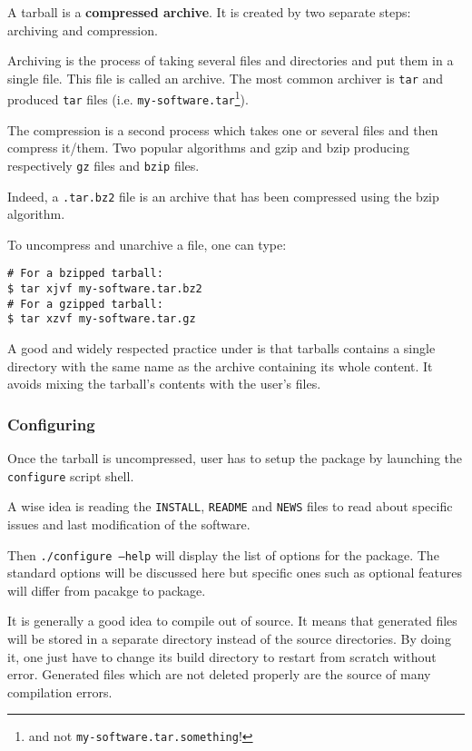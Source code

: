 A tarball is a \textbf{compressed archive}. It is created by two
separate steps: archiving and compression.

Archiving is the process of taking several files and directories and
put them in a single file. This file is called an archive. The most
common archiver is \texttt{tar} and produced \texttt{tar} files
(i.e. \texttt{my-software.tar}\footnote{and not
  \texttt{my-software.tar.something}!}).

The compression is a second process which takes one or several files
and then compress it/them. Two popular algorithms and gzip and bzip
producing respectively \texttt{gz} files and \texttt{bzip} files.

Indeed, a \texttt{.tar.bz2} file is an archive that has been
compressed using the bzip algorithm.


To uncompress and unarchive a file, one can type:
\begin{verbatim}
# For a bzipped tarball:
$ tar xjvf my-software.tar.bz2
# For a gzipped tarball:
$ tar xzvf my-software.tar.gz
\end{verbatim}

A good and widely respected practice under \linux is that tarballs
contains a single directory with the same name as the archive
containing its whole content. It avoids mixing the tarball's contents
with the user's files.


\subsubsection{Configuring}


Once the tarball is uncompressed, user has to setup the package by
launching the \texttt{configure} script shell.

A wise idea is reading the \texttt{INSTALL}, \texttt{README} and
\texttt{NEWS} files to read about specific issues and last
modification of the software.

Then \texttt{./configure --help} will display the list of options for
the package. The standard options will be discussed here but specific
ones such as optional features will differ from pacakge to package.


It is generally a good idea to compile out of source. It means that
generated files will be stored in a separate directory instead of the
source directories. By doing it, one just have to change its build
directory to restart from scratch without error. Generated files which
are not deleted properly are the source of many compilation errors.

